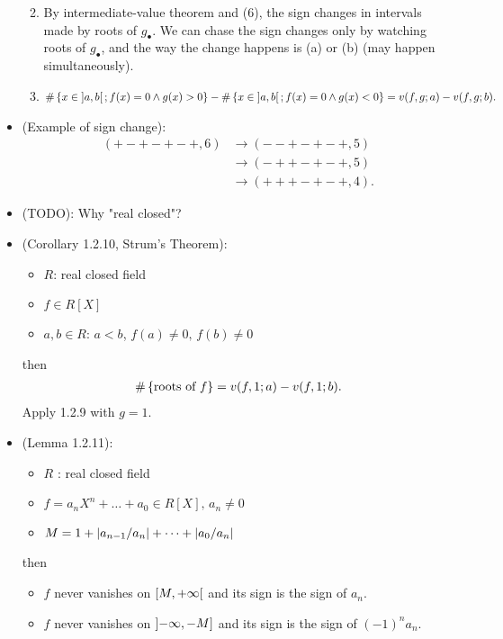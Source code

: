 \documentclass[9pt]{ltjsarticle}
\begin{document}
\begin{itemize}
\begin{enumerate}
\begin{enumerate}
      \end{enumerate}
      \item By intermediate-value theorem and (6),
      the sign changes in intervals made by roots of $g_\bullet$.
      We can chase the sign changes only by watching roots of $g_\bullet$,
      and the way the change happens is (a) or (b) (may happen simultaneously).
      \item
      \begin{align}
        \#\left\{x\in \left] a,b \right[; f(x) = 0 \land g(x)>0\right\} -
        \# \left\{x\in \left] a,b \right[; f(x)=0 \land g(x) < 0\right\} =
        v(f,g;a) - v(f,g;b).
      \end{align}
  \end{enumerate}
  \item
  (Example of sign change):
  \begin{align}
    (+-+-+-+,6)
    &\to
    (--+-+-+, 5)\\
    &\to
    (-++-+-+, 5)\\
    &\to
    (+++-+-+, 4).
  \end{align}
  \item (TODO): Why "real closed"?
  \item (Corollary 1.2.10, Strum's Theorem):
  \begin{itemize}
    \item $R$: real closed field
    \item $f\in R[X]$
    \item $a,b\in R$: $a<b$, $f(a)\neq 0,\, f(b)\neq 0$
  \end{itemize}
  then
  \begin{align}
    \# \left\{\text{roots of $f$}\right\} = v(f,1; a) - v(f,1;b).
  \end{align}
  \pf
  Apply 1.2.9 with $g=1$.
  \item
  (Lemma 1.2.11):
  \begin{itemize}
    \item $R$ : real closed field
    \item $f=a_n X^n + \dots + a_0 \in R[X],\, a_n \neq 0$
    \item $M=1+\left|a_{n-1}/a_n\right| + \dots + \left|a_0/a_n\right|$
  \end{itemize}
  then
  \begin{itemize}
    \item $f$ never vanishes on $\left[M,+\infty\right[$ and its sign is the sign of $a_n$.
    \item $f$ never vanishes on $\left]-\infty,-M\right]$ and its sign is the sign of $(-1)^na_n$.

\end{itemize}
\end{itemize}
\end{document}
